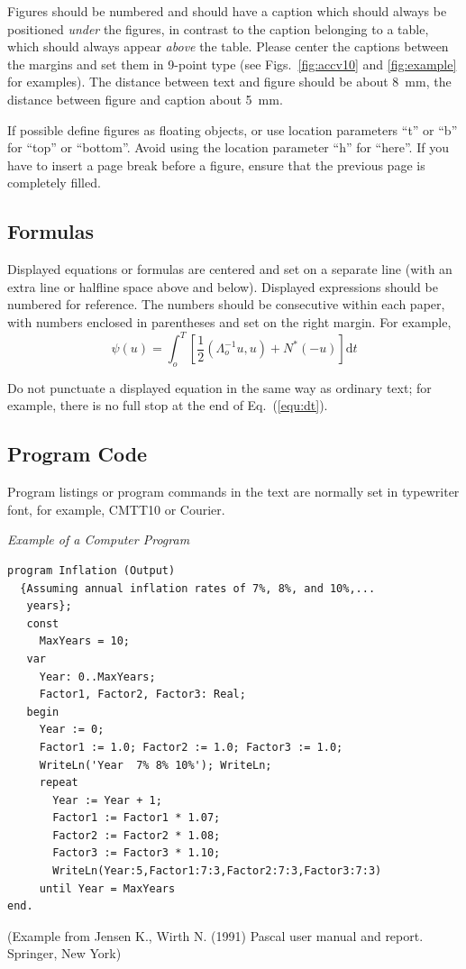 \documentclass[runningheads]{llncs}
\begin{document}
Figures should be numbered and should have a caption which should
always be positioned {\it under} the figures, in contrast to the caption
belonging to a table, which should always appear {\it above} the table.
Please center the captions between the margins and set them in
9-point type (see Figs.~\ref{fig:accv10} and \ref{fig:example} for examples).
The distance between text and figure should be about 8~mm, the
distance between figure and caption about 5~mm.

If possible define figures as floating
objects, or use location parameters ``t'' or ``b'' for ``top'' or ``bottom''. Avoid using the location
parameter ``h'' for ``here''. If you have to insert a page break before a
figure, ensure that the previous page is completely filled.

\subsection{Formulas}

Displayed equations or formulas are centered and set on a separate
line (with an extra line or halfline space above and below). Displayed
expressions should be numbered for reference. The numbers should be
consecutive within each paper,
with numbers enclosed in parentheses and set on the right margin.
For example,
%
\begin{equation}
  \psi (u) = \int_{o}^{T} \left[\frac{1}{2}
  \left(\Lambda_{o}^{-1} u,u\right) + N^{\ast} (-u)\right] \mathrm{d}t
  \label{equ:dt}
\end{equation}

Do not punctuate a displayed equation in the same way as ordinary
text; for example, there is no full stop at the end of Eq.~(\ref{equ:dt}).

\subsection{Program Code}

Program listings or program commands in the text are normally set in
typewriter font, for example, CMTT10 or Courier.

\medskip

\noindent
{\it Example of a Computer Program}
\begin{verbatim}
program Inflation (Output)
  {Assuming annual inflation rates of 7%, 8%, and 10%,...
   years};
   const
     MaxYears = 10;
   var
     Year: 0..MaxYears;
     Factor1, Factor2, Factor3: Real;
   begin
     Year := 0;
     Factor1 := 1.0; Factor2 := 1.0; Factor3 := 1.0;
     WriteLn('Year  7% 8% 10%'); WriteLn;
     repeat
       Year := Year + 1;
       Factor1 := Factor1 * 1.07;
       Factor2 := Factor2 * 1.08;
       Factor3 := Factor3 * 1.10;
       WriteLn(Year:5,Factor1:7:3,Factor2:7:3,Factor3:7:3)
     until Year = MaxYears
end.
\end{verbatim}
%
\noindent
{\small (Example from Jensen K., Wirth N. (1991) Pascal user manual and
report. Springer, New York)}
\end{document}
